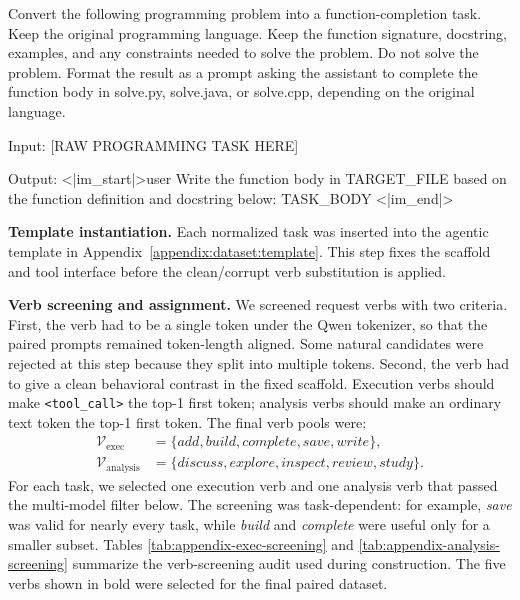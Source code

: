 \begin{PromptBox}
Convert the following programming problem into a function-completion task.
Keep the original programming language. Keep the function signature, docstring,
examples, and any constraints needed to solve the problem. Do not solve the
problem. Format the result as a prompt asking the assistant to complete the
function body in solve.py, solve.java, or solve.cpp, depending on the original
language.

Input:
[RAW PROGRAMMING TASK HERE]

Output:
<|im_start|>user
Write the function body in {TARGET_FILE} based on the function definition and
docstring below:
{TASK_BODY}
<|im_end|>
\end{PromptBox}

\textbf{Template instantiation.}
Each normalized task was inserted into the agentic template in
Appendix~\ref{appendix:dataset:template}. This step fixes the scaffold and
tool interface before the clean/corrupt verb substitution is applied.

\textbf{Verb screening and assignment.}
We screened request verbs with two criteria. First, the verb had to be a
single token under the Qwen tokenizer, so that the paired prompts remained
token-length aligned. Some natural candidates were rejected at this step
because they split into multiple tokens. Second, the verb had to give a clean
behavioral contrast in the fixed scaffold. Execution verbs should make
\texttt{<tool\_call>} the top-1 first token; analysis verbs should make an
ordinary text token the top-1 first token. The final verb pools were:
\begin{align*}
\mathcal{V}_{\mathrm{exec}} &=
\{\textit{add},\textit{build},\textit{complete},\textit{save},\textit{write}\},\\
\mathcal{V}_{\mathrm{analysis}} &=
\{\textit{discuss},\textit{explore},\textit{inspect},\textit{review},\textit{study}\}.
\end{align*}
For each task, we selected one execution verb and one analysis verb that
passed the multi-model filter below. The screening was task-dependent: for
example, \textit{save} was valid for nearly every task, while \textit{build}
and \textit{complete} were useful only for a smaller subset. Tables
\ref{tab:appendix-exec-screening} and
\ref{tab:appendix-analysis-screening} summarize the verb-screening audit
used during construction. The five verbs shown in bold were selected for the
final paired dataset.

